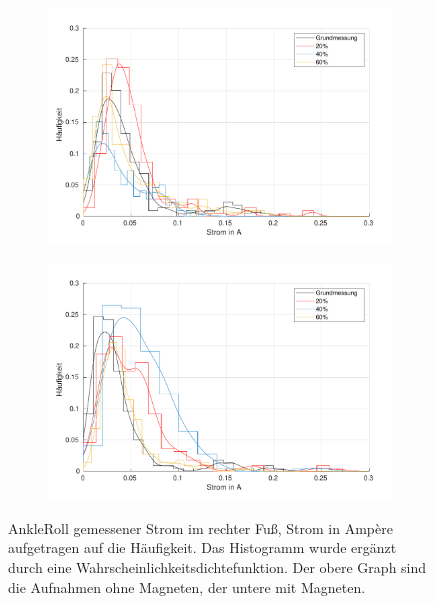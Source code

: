\begin{figure}[tb]
	\centering
	\begin{subfigure}[c]{.9\linewidth}
		\centering
		\includegraphics[width=\linewidth]{Bilder/rechts_Current_AnkleRoll_ohneM.pdf}
		\vspace{5pt}
	\end{subfigure}
	\hfill
	\begin{subfigure}[c]{.9\linewidth}
		\centering
		\includegraphics[width=\linewidth]{Bilder/rechts_Current_AnkleRoll_mitM.pdf}
		\vspace{5pt}
	\end{subfigure}
	\caption{AnkleRoll gemessener Strom im rechter Fuß, Strom in Ampère aufgetragen auf die Häufigkeit. Das Histogramm wurde ergänzt durch eine Wahrscheinlichkeitsdichtefunktion. Der obere Graph sind die Aufnahmen ohne Magneten, der untere mit Magneten.} \label{AnkleRoll_Current_rechts}
\end{figure}

